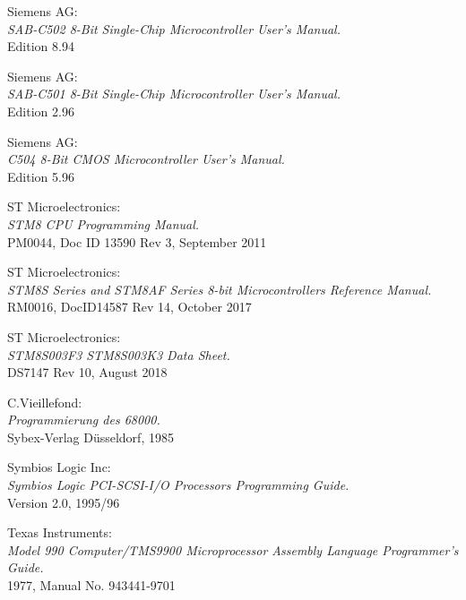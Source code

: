  Siemens AG: \\
                  {\em SAB-C502 8-Bit Single-Chip Microcontroller User's
                   Manual.\/} \\
                  Edition 8.94

 Siemens AG: \\
                  {\em SAB-C501 8-Bit Single-Chip Microcontroller User's
                   Manual.\/} \\
                  Edition 2.96

 Siemens AG: \\
                  {\em C504 8-Bit CMOS Microcontroller User's Manual.\/} \\
                  Edition 5.96

 ST Microelectronics: \\
                  {\em STM8 CPU Programming Manual.\/} \\
                  PM0044, Doc ID 13590 Rev 3, September 2011

 ST Microelectronics: \\
                  {\em STM8S Series and STM8AF Series 8-bit Microcontrollers Reference Manual.\/} \\
                  RM0016, DocID14587 Rev 14, October 2017

 ST Microelectronics: \\
                  {\em STM8S003F3 STM8S003K3 Data Sheet.\/} \\
                  DS7147 Rev 10, August 2018

 C.Vieillefond: \\
                 {\em Programmierung des 68000.\/} \\
                 Sybex-Verlag D\"usseldorf, 1985

 Symbios Logic Inc: \\
                 {\em Symbios Logic PCI-SCSI-I/O Processors Programming   
                 Guide.\/} \\
                 Version 2.0, 1995/96
                 
  Texas Instruments: \\
                 {\em Model 990 Computer/TMS9900 Microprocessor
                      Assembly Language Programmer's Guide.\/} \\
                 1977, Manual No. 943441-9701

